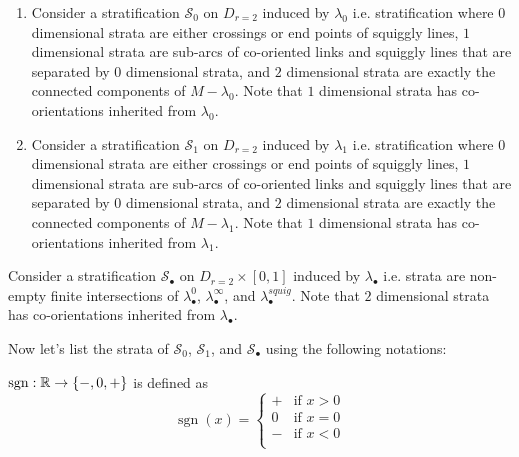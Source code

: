 \begin{definition}
\begin{enumerate}
\item Consider a stratification $\mathcal{S}_0$ on $D_{r=2}$ induced by $\lambda_0$ i.e. stratification where $0$ dimensional strata are either crossings or end points of squiggly lines, $1$ dimensional strata are sub-arcs of co-oriented links and squiggly lines that are separated by $0$ dimensional strata, and $2$ dimensional strata are exactly the connected components of $M-\lambda_0$. Note that $1$ dimensional strata has co-orientations inherited from $\lambda_0$.

\item Consider a stratification $\mathcal{S}_1$ on $D_{r=2}$ induced by $\lambda_1$ i.e. stratification where $0$ dimensional strata are either crossings or end points of squiggly lines, $1$ dimensional strata are sub-arcs of co-oriented links and squiggly lines that are separated by $0$ dimensional strata, and $2$ dimensional strata are exactly the connected components of $M-\lambda_1$. Note that $1$ dimensional strata has co-orientations inherited from $\lambda_1$.
\end{enumerate}

\item Consider a stratification $\mathcal{S}_\bullet$ on $D_{r=2}\times [0,1]$ induced by $\lambda_\bullet$ i.e. strata are non-empty finite intersections of $\lambda_\bullet^0$, $\lambda_\bullet^\infty$, and $\lambda_\bullet^{squig}$. Note that $2$ dimensional strata has co-orientations inherited from $\lambda_\bullet$.
\end{definition}

Now let's list the strata of $\mathcal{S}_0$, $\mathcal{S}_1$, and $\mathcal{S}_\bullet$ using the following notations:
\begin{definition}
$\operatorname{sgn} : \mathbb{R} \rightarrow \{-,0,+ \}$ is defined as 
\[\operatorname{sgn}(x)=\left\{
\begin{array}{ll}
    + & \text{if } x > 0 \\
    0 & \text{if } x = 0 \\
	- & \text{if } x < 0 \\
\end{array}
\right.
\]
\end{definition}

